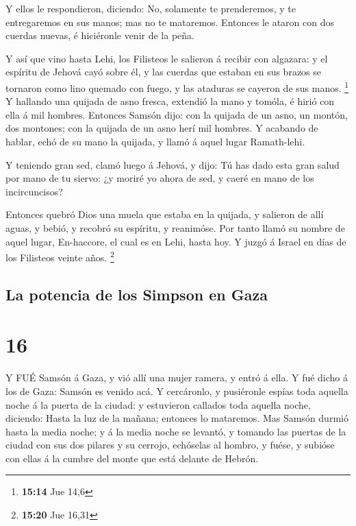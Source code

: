  Y ellos le respondieron, diciendo: No, solamente te
prenderemos, y te entregaremos en sus manos; mas no te mataremos.
Entonces le ataron con dos cuerdas nuevas, é hiciéronle venir de la
peña.

 Y así que vino hasta Lehi, los Filisteos le salieron á
recibir con algazara: y el espíritu de Jehová cayó sobre él, y las
cuerdas que estaban en sus brazos se tornaron como lino quemado con
fuego, y las ataduras se cayeron de sus manos. \footnote{\textbf{15:14}
  Jue 14,6}  Y hallando una quijada de asno fresca,
extendió la mano y tomóla, é hirió con ella á mil hombres. 
Entonces Samsón dijo: con la quijada de un asno, un montón, dos
montones; con la quijada de un asno herí mil hombres.  Y
acabando de hablar, echó de su mano la quijada, y llamó á aquel lugar
Ramath-lehi.

 Y teniendo gran sed, clamó luego á Jehová, y dijo: Tú has
dado esta gran salud por mano de tu siervo: ¿y moriré yo ahora de sed, y
caeré en mano de los incircuncisos?

 Entonces quebró Dios una muela que estaba en la quijada, y
salieron de allí aguas, y bebió, y recobró su espíritu, y reanimóse. Por
tanto llamó su nombre de aquel lugar, En-haccore, el cual es en Lehi,
hasta hoy.  Y juzgó á Israel en días de los Filisteos
veinte años. \footnote{\textbf{15:20} Jue 16,31}

\hypertarget{la-potencia-de-los-simpson-en-gaza}{%
\subsection{La potencia de los Simpson en
Gaza}\label{la-potencia-de-los-simpson-en-gaza}}

\hypertarget{section-15}{%
\section{16}\label{section-15}}

 Y FUÉ Samsón á Gaza, y vió allí una mujer ramera, y entró á
ella.  Y fué dicho á los de Gaza: Samsón es venido acá. Y
cercáronlo, y pusiéronle espías toda aquella noche á la puerta de la
ciudad: y estuvieron callados toda aquella noche, diciendo: Hasta la luz
de la mañana; entonces lo mataremos.  Mas Samsón durmió
hasta la media noche; y á la media noche se levantó, y tomando las
puertas de la ciudad con sus dos pilares y su cerrojo, echóselas al
hombro, y fuése, y subióse con ellas á la cumbre del monte que está
delante de Hebrón.

